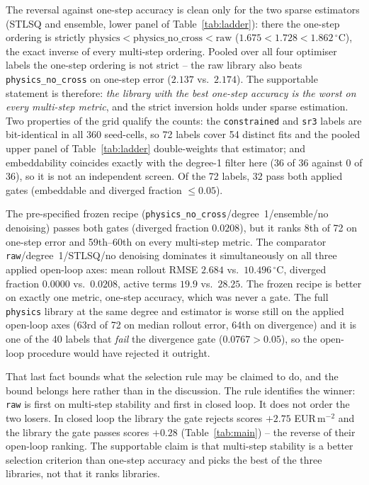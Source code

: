 The reversal against one-step accuracy is clean only for the two sparse estimators
(STLSQ and ensemble, lower panel of Table~\ref{tab:ladder}): there the one-step ordering
is strictly $\text{physics} < \text{physics\_no\_cross} < \text{raw}$
($1.675 < 1.728 < 1.862\,^\circ$C), the exact inverse of every multi-step ordering.
Pooled over all four optimiser labels the one-step ordering is not strict -- the raw
library also beats \texttt{physics\_no\_cross} on one-step error ($2.137$ vs.\ $2.174$).
The supportable statement is therefore: \emph{the library with the best one-step accuracy
is the worst on every multi-step metric}, and the strict inversion holds under sparse
estimation. Two properties of the grid qualify the counts: the \texttt{constrained} and
\texttt{sr3} labels are bit-identical in all 360 seed-cells, so 72 labels cover 54 distinct
fits and the pooled upper panel of Table~\ref{tab:ladder} double-weights that estimator;
and embeddability coincides exactly with the degree-1 filter here (36 of 36 against
0 of 36), so it is not an independent screen. Of the 72 labels, 32 pass both
applied gates (embeddable and diverged fraction $\le 0.05$).

The pre-specified frozen recipe
(\texttt{physics\_no\_cross}/degree~1/ensemble/no denoising) passes both gates
(diverged fraction $0.0208$), but it ranks 8th of 72 on one-step error and 59th--60th on
every multi-step metric. The comparator \texttt{raw}/degree~1/STLSQ/no denoising
dominates it simultaneously on all three applied open-loop axes: mean rollout RMSE $2.684$
vs.\ $10.496\,^\circ$C, diverged fraction $0.0000$ vs.\ $0.0208$, active terms $19.9$ vs.\
$28.25$. The frozen recipe is better on exactly one metric, one-step accuracy, which was
never a gate. The full \texttt{physics} library at the same degree and estimator is worse
still on the applied open-loop axes (63rd of 72 on median rollout error, 64th on divergence) and it is one of the 40 labels that \emph{fail} the divergence gate
($0.0767 > 0.05$), so the open-loop procedure would have rejected it outright.

That last fact bounds what the selection rule may be claimed to do, and the bound belongs
here rather than in the discussion. The rule identifies the winner: \texttt{raw} is first
on multi-step stability and first in closed loop. It does not order the two losers. In
closed loop the library the gate rejects scores $+2.75$ EUR\,m$^{-2}$ and the library the
gate passes scores $+0.28$ (Table~\ref{tab:main}) -- the reverse of their open-loop
ranking. The supportable claim is that multi-step stability is a better selection criterion
than one-step accuracy and picks the best of the three libraries, not that it ranks
libraries.

